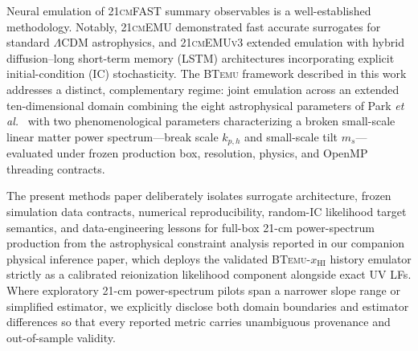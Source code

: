 \documentclass[aps,prd,reprint,superscriptaddress,nofootinbib,amsmath,amssymb,floatfix,longbibliography]{revtex4-2}
\begin{document}
Neural emulation of \textsc{21cmFAST} summary observables is a well-established methodology. Notably, \textsc{21cmEMU} \cite{Breitman2024} demonstrated fast accurate surrogates for standard $\Lambda$CDM astrophysics, and \textsc{21cmEMUv3} \cite{Breitman2026} extended emulation with hybrid diffusion--long short-term memory (LSTM) architectures incorporating explicit initial-condition (IC) stochasticity. The \textsc{BTemu} framework described in this work addresses a distinct, complementary regime: joint emulation across an extended ten-dimensional domain combining the eight astrophysical parameters of Park \textit{et al.}~\cite{Park2019} with two phenomenological parameters characterizing a broken small-scale linear matter power spectrum---break scale $k_{p,h}$ and small-scale tilt $m_s$---evaluated under frozen production box, resolution, physics, and OpenMP threading contracts.

The present methods paper deliberately isolates surrogate architecture, frozen simulation data contracts, numerical reproducibility, random-IC likelihood target semantics, and data-engineering lessons for full-box 21-cm power-spectrum production from the astrophysical constraint analysis reported in our companion physical inference paper, which deploys the validated \textsc{BTemu}-$x_{\mathrm{HI}}$ history emulator strictly as a calibrated reionization likelihood component alongside exact UV LFs. Where exploratory 21-cm power-spectrum pilots span a narrower slope range or simplified estimator, we explicitly disclose both domain boundaries and estimator differences so that every reported metric carries unambiguous provenance and out-of-sample validity.
\end{document}
